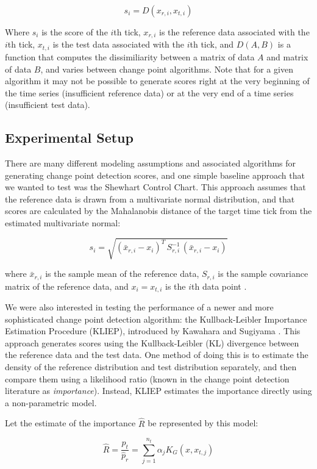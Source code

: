 \[
s_i = D(x_{r,i}, x_{t,i})
\]

Where $s_i$ is the score of the $i$th tick, $x_{r,i}$ is the reference
data associated with the $i$th tick, $x_{t,i}$ is the test data
associated with the $i$th tick, and $D(A,B)$ is a function that computes the
dissimiliarity between a matrix of data $A$ and matrix of data $B$, and varies
between change point algorithms. Note that for a given
algorithm it may not be possible to generate scores right at the very beginning
of the time series (insufficient reference data) or at the very end of a time
series (insufficient test data).

\subsection{Experimental Setup}

There are many different modeling assumptions and associated algorithms
for generating change point detection scores, and one simple baseline approach that we 
wanted to test was the Shewhart Control Chart. This approach assumes that the reference data is drawn from a
multivariate normal distribution, and that scores are calculated by the Mahalanobis
distance of the target time tick from the estimated multivariate normal:

\[
s_i = \sqrt{(\bar{x}_{r,i} - x_i)^T \, S_{r,i}^{-1} \, (\bar{x}_{r,i} - x_i)}
\]

where $\bar{x}_{r,i}$ is the sample mean of the reference data, $S_{r,i}$
is the sample covariance matrix of the reference data, and $x_i=x_{t,i}$ is
the $i$th data point \cite{shewhart26}.

We were also interested in testing the performance of a newer and more
sophisticated change point detection algorithm: the
Kullback-Leibler Importance Estimation Procedure (KLIEP),
introduced by Kawahara and Sugiyama \cite{sugiyama09} \cite{sugiyama08}.
This approach generates scores using the Kullback-Leibler (KL)
divergence between the reference data and the test data. One method of doing this
is to estimate the density of the reference distribution and test distribution
separately, and then compare them using a likelihood ratio
(known in the change point detection literature as \emph{importance}). 
Instead, KLIEP estimates the importance directly using a non-parametric model.

Let the estimate of the importance $\hat{R}$ be represented by this model:

\[
\hat{R} = \frac{p_{t}}{\hat{p}_{r}} = \sum_{j=1}^{n_{t}} \alpha_j K_G(x,x_{t,j})
\]


